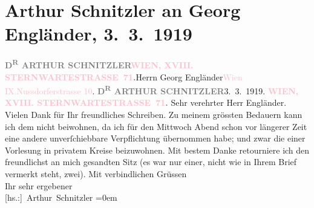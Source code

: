 

               \section[Arthur Schnitzler an Georg Engländer, 3. 3. 1919]{ Arthur Schnitzler an Georg Engländer, 3. 3. 1919}\nopagebreak{}\rehead{ }\normalsize\beginnumbering{} \toendnotes[C]{\smallbreak\pagebreak[2]} 
\toendnotes[C]{\smallbreak}\pstart{}{\pb}\textcolor{gray}{\textbf{D\textsuperscript{R} ARTHUR SCHNITZLER}}\pend{}\pstart{}\textcolor{gray}{\textbf{\textcolor{pink}{WIEN, XVIII. STERNWARTESTRASSE 71}{}\ledrightnote{\textcolor{pink}{Sternwartestraße}}.}}\pend{}{\bigskip}\pstart{}{\pb}Herrn Georg Engländer\pend{}\pstart{}\textcolor{pink}{Wien IX.}{}\ledrightnote{\textcolor{pink}{IX., Alsergrund}}\pend{}\pstart{}\textcolor{pink}{Nussdorferstrasse 10}{}\ledrightnote{\textcolor{pink}{Nussdorfer Straße}}.\pend{}{\bigskip}\pstart
           \noindent{}{\pb}\textcolor{gray}{\textbf{D\textsuperscript{R} ARTHUR SCHNITZLER}}\hfill 3. 3. 1919.\pend
           \pstart
           \textcolor{gray}{\textbf{\textcolor{pink}{WIEN, XVIII. STERNWARTESTRASSE 71}{}\ledrightnote{\textcolor{pink}{Sternwartestraße}}.}}\pend
           \pstart\center{}Sehr verehrter Herr Engländer.\pend\pstart
           Vielen Dank für Ihr freundliches Schreiben. Zu meinem grössten Bedauern kann ich dem
                  \label{K_L02322_1v}\label{K_L02322_1h} nicht beiwohnen, da ich für
               den Mittwoch{ }Abend schon vor längerer Zeit eine andere \introOben{}unverſchiebbare\introOben{} Verpflichtung übernommen habe\introOben{};\introOben{}
               und zwar die einer Vorlesung in privatem Kreise beizuwohnen.\pend
           \pstart
           {\pb}Mit bestem Danke retourniere ich den freundlichst
               an mich gesandten Sitz (es war nur einer, nicht wie in Ihrem Brief vermerkt steht,
               zwei).\pend
           \pstart
           Mit verbindlichen Grüssen{\\[\baselineskip]}Ihr sehr ergebener{\\[\baselineskip]}\spacefill\mbox{{[}hs.:{]} Arthur Schnitzler}\pend
           \leftskip=0em{}\endnumbering{}  
      